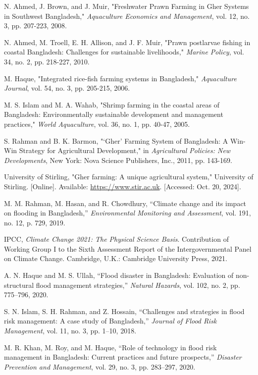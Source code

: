 \documentclass[conference]{IEEEtran}
\begin{document}
\begin{thebibliography}{99}

 N. Ahmed, J. Brown, and J. Muir, "Freshwater Prawn Farming in Gher Systems in Southwest Bangladesh," \textit{Aquaculture Economics and Management}, vol. 12, no. 3, pp. 207-223, 2008.

 N. Ahmed, M. Troell, E. H. Allison, and J. F. Muir, "Prawn postlarvae fishing in coastal Bangladesh: Challenges for sustainable livelihoods," \textit{Marine Policy}, vol. 34, no. 2, pp. 218-227, 2010.

 M. Haque, "Integrated rice-fish farming systems in Bangladesh," \textit{Aquaculture Journal}, vol. 54, no. 3, pp. 205-215, 2006.

 M. S. Islam and M. A. Wahab, "Shrimp farming in the coastal areas of Bangladesh: Environmentally sustainable development and management practices," \textit{World Aquaculture}, vol. 36, no. 1, pp. 40-47, 2005.

 S. Rahman and B. K. Barmon, "‘Gher’ Farming System of Bangladesh: A Win-Win Strategy for Agricultural Development," in \textit{Agricultural Policies: New Developments}, New York: Nova Science Publishers, Inc., 2011, pp. 143-169.

 University of Stirling, "Gher farming: A unique agricultural system," University of Stirling. [Online]. Available: \url{https://www.stir.ac.uk}. [Accessed: Oct. 20, 2024].

 M. M. Rahman, M. Hasan, and R. Chowdhury, “Climate change and its impact on flooding in Bangladesh,” \textit{Environmental Monitoring and Assessment}, vol. 191, no. 12, p. 729, 2019.

 IPCC, \textit{Climate Change 2021: The Physical Science Basis}. Contribution of Working Group I to the Sixth Assessment Report of the Intergovernmental Panel on Climate Change. Cambridge, U.K.: Cambridge University Press, 2021.

 A. N. Haque and M. S. Ullah, “Flood disaster in Bangladesh: Evaluation of non-structural flood management strategies,” \textit{Natural Hazards}, vol. 102, no. 2, pp. 775–796, 2020.

 S. N. Islam, S. H. Rahman, and Z. Hossain, “Challenges and strategies in flood risk management: A case study of Bangladesh,” \textit{Journal of Flood Risk Management}, vol. 11, no. 3, pp. 1–10, 2018.

 M. R. Khan, M. Roy, and M. Haque, “Role of technology in flood risk management in Bangladesh: Current practices and future prospects,” \textit{Disaster Prevention and Management}, vol. 29, no. 3, pp. 283–297, 2020.


\end{thebibliography}
\end{document}
